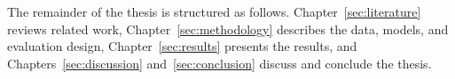 The remainder of the thesis is structured as follows. Chapter~\ref{sec:literature}
reviews related work, Chapter~\ref{sec:methodology} describes the data,
models, and evaluation design, Chapter~\ref{sec:results} presents the results,
and Chapters~\ref{sec:discussion} and~\ref{sec:conclusion} discuss and
conclude the thesis.
